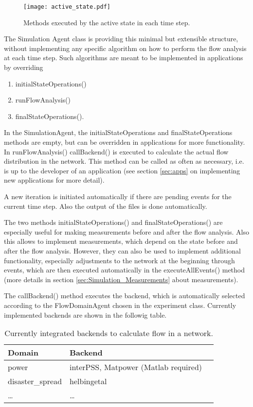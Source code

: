 \documentclass[11pt,fleqn]{book} %
\newcommand{\MainAgent}{Simulation Agent}
\newcommand{\Backend}[1][]{Backend#1} %
\newcommand{\backend}[1][]{backend#1}
\newcommand{\Domain}[1][]{Domain#1} %
\begin{document}
\begin{figure}[!h]
\centering\texttt{[image: active\_state.pdf]}
\caption{Methods executed by the active state in each time step.}
\label{fig:active_state}
\end{figure}

The \MainAgent{} class is providing this minimal but extensible structure, without implementing any specific algorithm on how to perform the flow analysis at each time step. Such algorithms are meant to be implemented in applications by overriding 
\begin{enumerate}
	\item initialStateOperations()
	\item runFlowAnalysis()
	\item finalStateOperations().
\end{enumerate}

In the SimulationAgent, the initialStateOperations and finalStateOperations methods are empty, but can be overridden in applications for more functionality. In runFlowAnalysis() callBackend() is executed to calculate the actual flow distribution in the network. This method can be called as often as necessary, i.e. is up to the developer of an application (see section \ref{sec:apps} on implementing new applications for more detail). 

A new iteration is initiated automatically if there are pending events for the current time step. Also the output of the files is done automatically. 

The two methods initialStateOperations() and finalStateOperations() are especially useful for making measurements before and after the flow analysis. Also this allows to implement measurements, which depend on the state before and after the flow analysis. However, they can also be used to implement additional functionality, especially adjustments to the network at the beginning through events, which are then executed automatically in the executeAllEvents() method (more details in section \ref{sec:Simulation_Measurements} about measurements).

The callBackend() method executes the \backend{}, which is automatically selected according to the FlowDomainAgent chosen in the experiment class. Currently implemented \backend{s} are shown in the followig table.
\begin{table}[h]
	\centering
	\begin{tabular}{|l| l |l|}
	\hline
	\rowcolor{Gray}
	\textbf{\Domain{}}&\textbf{\Backend{}}\\
	\hline
	power & interPSS, Matpower (Matlab required)\\
	\hline
	disaster\_spread & helbingetal\\
	\hline
	\dots & \dots\\
	\hline
	\end{tabular}
	\label{table:backends}
	\caption{Currently integrated \backend{s} to calculate flow in a network.}
\end{table}
\end{document}

